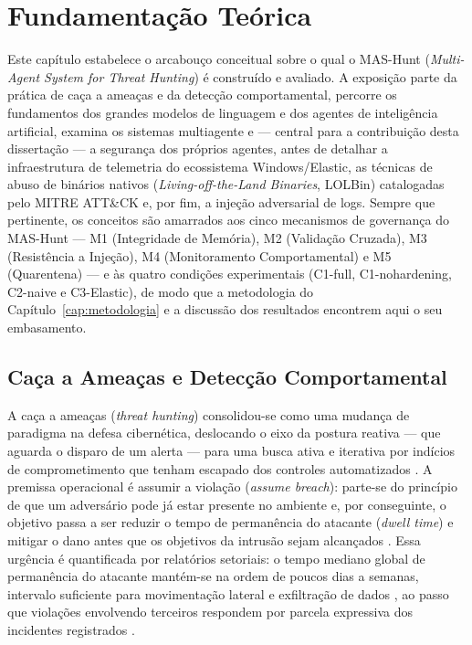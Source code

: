
\chapter{Fundamentação Teórica}
\label{cap:fundamentacao}

Este capítulo estabelece o arcabouço conceitual sobre o qual o MAS-Hunt (\textit{Multi-Agent System for Threat Hunting}) é construído e avaliado. A exposição parte da prática de caça a ameaças e da detecção comportamental, percorre os fundamentos dos grandes modelos de linguagem e dos agentes de inteligência artificial, examina os sistemas multiagente e — central para a contribuição desta dissertação — a segurança dos próprios agentes, antes de detalhar a infraestrutura de telemetria do ecossistema Windows/Elastic, as técnicas de abuso de binários nativos (\textit{Living-off-the-Land Binaries}, LOLBin) catalogadas pelo MITRE ATT\&CK e, por fim, a injeção adversarial de logs. Sempre que pertinente, os conceitos são amarrados aos cinco mecanismos de governança do MAS-Hunt — M1 (Integridade de Memória), M2 (Validação Cruzada), M3 (Resistência a Injeção), M4 (Monitoramento Comportamental) e M5 (Quarentena) — e às quatro condições experimentais (C1-full, C1-nohardening, C2-naive e C3-Elastic), de modo que a metodologia do Capítulo~\ref{cap:metodologia} e a discussão dos resultados encontrem aqui o seu embasamento.

\section{Caça a Ameaças e Detecção Comportamental}
\label{sec:cacaameacas}

A caça a ameaças (\textit{threat hunting}) consolidou-se como uma mudança de paradigma na defesa cibernética, deslocando o eixo da postura reativa — que aguarda o disparo de um alerta — para uma busca ativa e iterativa por indícios de comprometimento que tenham escapado dos controles automatizados \cite{academia22}. A premissa operacional é assumir a violação (\textit{assume breach}): parte-se do princípio de que um adversário pode já estar presente no ambiente e, por conseguinte, o objetivo passa a ser reduzir o tempo de permanência do atacante (\textit{dwell time}) e mitigar o dano antes que os objetivos da intrusão sejam alcançados \cite{hillier2022turninghuntedhunterthreat}. Essa urgência é quantificada por relatórios setoriais: o tempo mediano global de permanência do atacante mantém-se na ordem de poucos dias a semanas, intervalo suficiente para movimentação lateral e exfiltração de dados \cite{mandiant2025mtrends}, ao passo que violações envolvendo terceiros respondem por parcela expressiva dos incidentes registrados \cite{verizon2025dbir}.

